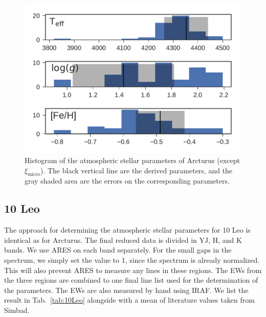 \documentclass{aa}
\begin{document}
\begin{figure}[tpb]
    \centering
    \includegraphics[width=1.0\linewidth]{figures/ArcturusParams.pdf}
    \caption{Histogram of the atmospheric stellar parameters of Arcturus (except
             $\xi_\mathrm{micro}$). The black vertical line are the derived
             parameters, and the gray shaded area are the errors on the
             corresponding parameters.}
    \label{fig:arcturus}
\end{figure}



\subsection{10 Leo}
\label{sec:10Leo}

The approach for determining the atmospheric stellar parameters for 10 Leo is
identical as for Arcturus. The final reduced data is divided in YJ, H, and K
bands. We use ARES on each band separately. For the small gaps in the spectrum,
we simply set the value to 1, since the spectrum is already normalized. This
will also prevent ARES to measure any lines in these regions. The EWs from the
three regions are combined to one final line list used for the determination of
the parameters. The EWs are also measured by hand using IRAF. We list the result
in Tab.~\ref{tab:10Leo} alongside with a mean of literature values taken from
Simbad.
\end{document}
